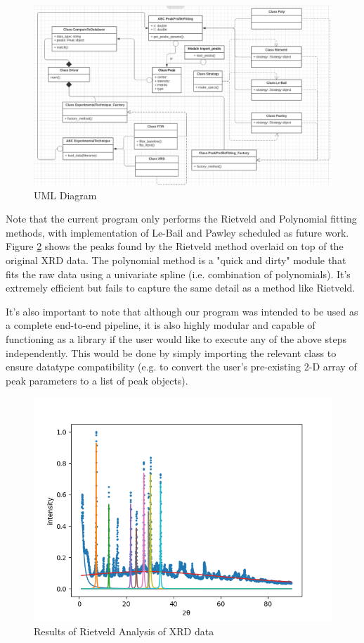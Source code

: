 \documentclass{dhbenelux}
\begin{document}
\begin{figure}
    \centering
    \includegraphics[scale=0.8]{APC_UML.png}
    \caption[UML Diagram]{UML Diagram}
    \label{fig:UML}
\end{figure}

Note that the current program only performs the Rietveld and Polynomial fitting methods, with implementation of Le-Bail and Pawley scheduled as future work. Figure \ref{fig:rietveld_ex} shows the peaks found by the Rietveld method overlaid on top of the original XRD data. The polynomial method is a "quick and dirty" module that fits the raw data using a univariate spline (i.e. combination of polynomials). It's extremely efficient but fails to capture the same detail as a method like Rietveld. 

It's also important to note that although our program was intended to be used as a complete end-to-end pipeline, it is also highly modular and capable of functioning as a library if the user would like to execute any of the above steps independently. This would be done by simply importing the relevant class to ensure datatype compatibility (e.g. to convert the user's pre-existing 2-D array of peak parameters to a list of peak objects).

\begin{figure}[!h]
    \centering
    \includegraphics[scale=0.7]{figure1 for presentation.png}
    \caption{Results of Rietveld Analysis of XRD data}
    \label{fig:rietveld_ex}
\end{figure}
\end{document}
